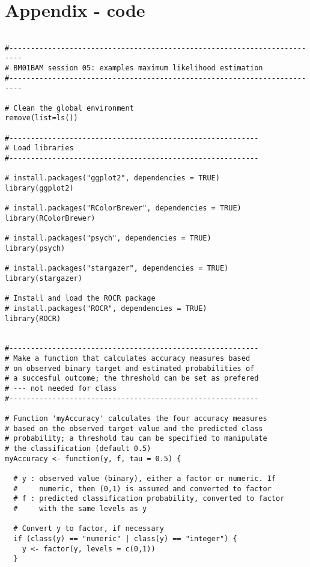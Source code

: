 \documentclass{article}
\begin{document}
\newpage

\appendix

\section{Appendix - code}
\begin{tiny}
\begin{verbatim}

#-------------------------------------------------------------------------
# BM01BAM session 05: examples maximum likelihood estimation
#-------------------------------------------------------------------------

# Clean the global environment
remove(list=ls())

#----------------------------------------------------------
# Load libraries
#----------------------------------------------------------

# install.packages("ggplot2", dependencies = TRUE)
library(ggplot2)

# install.packages("RColorBrewer", dependencies = TRUE)
library(RColorBrewer)

# install.packages("psych", dependencies = TRUE)
library(psych)

# install.packages("stargazer", dependencies = TRUE)
library(stargazer)

# Install and load the ROCR package
# install.packages("ROCR", dependencies = TRUE)
library(ROCR)


#----------------------------------------------------------
# Make a function that calculates accuracy measures based 
# on observed binary target and estimated probabilities of
# a succesful outcome; the threshold can be set as prefered
# --- not needed for class
#----------------------------------------------------------

# Function 'myAccuracy' calculates the four accuracy measures
# based on the observed target value and the predicted class
# probability; a threshold tau can be specified to manipulate
# the classification (default 0.5)
myAccuracy <- function(y, f, tau = 0.5) {
  
  # y : observed value (binary), either a factor or numeric. If
  #     numeric, then (0,1) is assumed and converted to factor 
  # f : predicted classification probability, converted to factor
  #     with the same levels as y
  
  # Convert y to factor, if necessary
  if (class(y) == "numeric" | class(y) == "integer") {
    y <- factor(y, levels = c(0,1))
  }
  

\end{verbatim}
\end{tiny}
\end{document}
